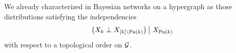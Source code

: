 We already characterized in  Bayesian networks on a hypergraph as those distributions satisfying the independencies
\begin{align*}
    \left(X_{k}\perp X_{[k]\backslash\mathrm{Pa}(k)}\middle)\,\right|\,X_{\mathrm{Pa}(k)}
\end{align*}
with respect to a topological order on $\mathcal{G}$.


